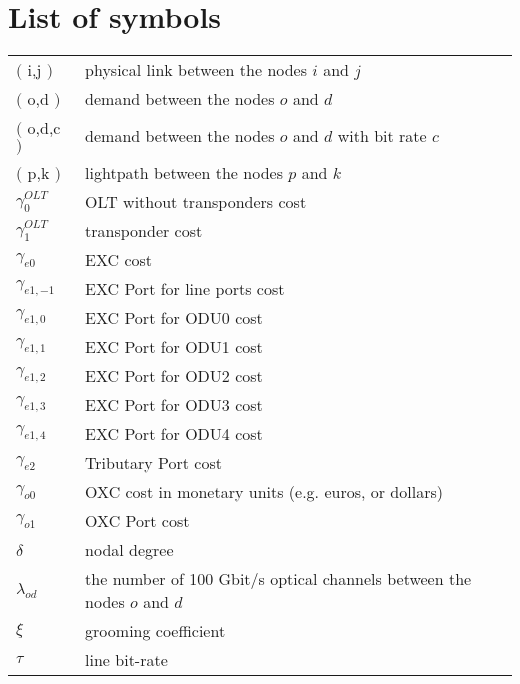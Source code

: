 \chapter*{List of symbols}

\begin{table}[!ht]
\renewcommand{\arraystretch}{1.3}
	\flushright	
	\begin{tabular}{l p{}}
$($ i,j $)$ & physical link between the nodes $i$ and $j$ \\
$($ o,d $)$ & demand between the nodes $o$ and $d$ \\
$($ o,d,c $)$ & demand between the nodes $o$ and $d$ with bit rate $c$ \\
$($ p,k $)$ & lightpath between the nodes $p$ and $k$ \\[3mm]	

$\gamma_0^{OLT}$ & OLT without transponders cost \\
$\gamma_1^{OLT}$ & transponder cost\\
$\gamma_{e0}$ & EXC cost\\
$\gamma_{e1,-1}$ & EXC Port for line ports cost\\
$\gamma_{e1,0}$ & EXC Port for ODU0 cost\\
$\gamma_{e1,1}$ & EXC Port for ODU1 cost\\
$\gamma_{e1,2}$ & EXC Port for ODU2 cost\\
$\gamma_{e1,3}$ & EXC Port for ODU3 cost\\
$\gamma_{e1,4}$ & EXC Port for ODU4 cost\\
$\gamma_{e2}$ & Tributary Port cost\\
$\gamma_{o0}$ & OXC cost in monetary units (e.g. euros, or dollars)\\
$\gamma_{o1}$ & OXC Port cost\\ [3mm]	

$\delta$ & nodal degree \\ [3mm]

$\lambda_{od}$ & the number of 100 Gbit/s optical channels between the nodes $o$ and $d$ \\ [3mm]

$\xi$ & grooming coefficient \\ [3mm]

$\tau$ & line bit-rate\\ [3mm]
	\end{tabular}	
\end{table}


